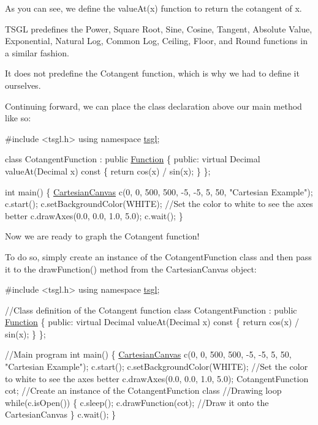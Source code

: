 As you can see, we define the value\+At(x) function to return the cotangent of x.

T\+S\+G\+L predefines the Power, Square Root, Sine, Cosine, Tangent, Absolute Value, Exponential, Natural Log, Common Log, Ceiling, Floor, and Round functions in a similar fashion.

It does not predefine the Cotangent function, which is why we had to define it ourselves.

Continuing forward, we can place the class declaration above our main method like so\+:


\begin{DoxyCode}
\textcolor{preprocessor}{#include <tsgl.h>}
\textcolor{keyword}{using namespace }\hyperlink{namespacetsgl}{tsgl};

\textcolor{keyword}{class }CotangentFunction : \textcolor{keyword}{public} \hyperlink{classtsgl_1_1_function}{Function} \{
 \textcolor{keyword}{public}:
    \textcolor{keyword}{virtual} Decimal valueAt(Decimal x)\textcolor{keyword}{ const }\{
      \textcolor{keywordflow}{return} cos(x) / sin(x);
    \}
\};

\textcolor{keywordtype}{int} main() \{
  \hyperlink{classtsgl_1_1_cartesian_canvas}{CartesianCanvas} c(0, 0, 500, 500, -5, -5, 5, 50, \textcolor{stringliteral}{"Cartesian Example"});
  c.start();
  c.setBackgroundColor(WHITE); \textcolor{comment}{//Set the color to white to see the axes better}
  c.drawAxes(0.0, 0.0, 1.0, 5.0);
  c.wait();
\}
\end{DoxyCode}


Now we are ready to graph the Cotangent function!

To do so, simply create an instance of the Cotangent\+Function class and then pass it to the draw\+Function() method from the Cartesian\+Canvas object\+:


\begin{DoxyCode}
\textcolor{preprocessor}{#include <tsgl.h>}
\textcolor{keyword}{using namespace }\hyperlink{namespacetsgl}{tsgl};

\textcolor{comment}{//Class definition of the Cotangent function}
\textcolor{keyword}{class }CotangentFunction : \textcolor{keyword}{public} \hyperlink{classtsgl_1_1_function}{Function} \{
 \textcolor{keyword}{public}:
    \textcolor{keyword}{virtual} Decimal valueAt(Decimal x)\textcolor{keyword}{ const }\{
      \textcolor{keywordflow}{return} cos(x) / sin(x);
    \}
\};

\textcolor{comment}{//Main program}
\textcolor{keywordtype}{int} main() \{
  \hyperlink{classtsgl_1_1_cartesian_canvas}{CartesianCanvas} c(0, 0, 500, 500, -5, -5, 5, 50, \textcolor{stringliteral}{"Cartesian Example"});
  c.start();
  c.setBackgroundColor(WHITE);  \textcolor{comment}{//Set the color to white to see the axes better}
  c.drawAxes(0.0, 0.0, 1.0, 5.0);
  CotangentFunction cot;  \textcolor{comment}{//Create an instance of the CotangentFunction class}
  \textcolor{comment}{//Drawing loop}
  \textcolor{keywordflow}{while}(c.isOpen()) \{
    c.sleep();
    c.drawFunction(cot); \textcolor{comment}{//Draw it onto the CartesianCanvas}
  \}
  c.wait();
\}
\end{DoxyCode}


